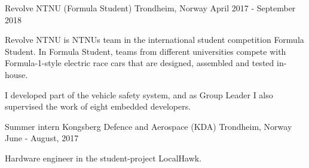 \begin{cventries}
        {Revolve NTNU (Formula Student)}
        {Trondheim, Norway}
        {April 2017 - September 2018}
        {
        \begin{cvitems}
            \item {Revolve NTNU is NTNUs team in the international student competition Formula Student. In Formula Student, teams from different universities compete with Formula-1-style electric race cars that are designed, assembled and tested in-house.}
            \item {I developed part of the vehicle safety system, and as Group Leader I also supervised the work of eight embedded developers.}
        \end{cvitems}
        }
    \cventryYJS
        {Summer intern}
        {Kongsberg Defence and Aerospace (KDA)}
        {Trondheim, Norway}
        {June - August, 2017}
        {
        \begin{cvitems}
            \item {Hardware engineer in the student-project LocalHawk.}
        \end{cvitems}
        }
\end{cventries}

